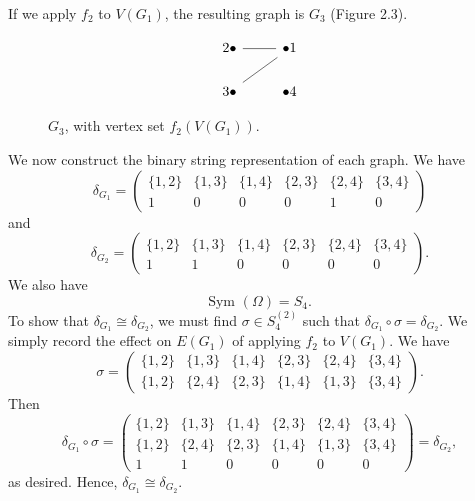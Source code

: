\begin{example}
If we apply $f_2$ to $V(G_1)$, the resulting graph is $G_3$ (Figure 2.3).
\begin{figure}
\[\begin{tikzcd}
	2\bullet & {\bullet 1} \\
	3\bullet & {\bullet 4}
	\arrow[no head, from=1-1, to=1-2]
	\arrow[no head, from=1-2, to=2-1]
\end{tikzcd}\]
\caption{$G_3$, with vertex set $f_2(V(G_1))$.}
\end{figure}
We now construct the binary string representation of each graph. We have \[\delta_{G_1}=\begin{pmatrix}\{1,2\}&\{1,3\}&\{1,4\}&\{2,3\}&\{2,4\}&\{3,4\}\\
1&0&0&0&1&0
\end{pmatrix}\] and 
\[\delta_{G_2}=\begin{pmatrix}\{1,2\}&\{1,3\}&\{1,4\}&\{2,3\}&\{2,4\}&\{3,4\}\\
1&1&0&0&0&0
\end{pmatrix}.\] We also have
\[\text{Sym }(\Omega)=S_4.\]
To show that $\delta_{G_1}\cong\delta_{G_2}$, we must find $\sigma\in S_4^{(2)}$ such that $\delta_{G_1}\circ \sigma =\delta_{G_2}$. We simply record the effect on $E(G_1)$ of applying $f_2$ to $V(G_1)$. We have
\[\sigma =\begin{pmatrix}\{1,2\}&\{1,3\}&\{1,4\}&\{2,3\}&\{2,4\}&\{3,4\}\\
\{1,2\}&\{2,4\}&\{2,3\}&\{1,4\}&\{1,3\}&\{3,4\}
\end{pmatrix}.\]
Then 
\[\delta_{G_1}\circ \sigma=\begin{pmatrix}\{1,2\}&\{1,3\}&\{1,4\}&\{2,3\}&\{2,4\}&\{3,4\}\\
\{1,2\}&\{2,4\}&\{2,3\}&\{1,4\}&\{1,3\}&\{3,4\}\\
1&1&0&0&0&0
\end{pmatrix}=\delta_{G_2},\]
as desired. Hence, $\delta_{G_1}\cong\delta_{G_2}$.
\end{example}

